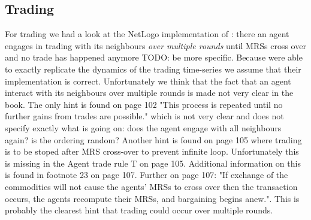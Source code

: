 \subsection{Trading}
For trading we had a look at the NetLogo implementation of \cite{weaver_replicating_nodate}: there an agent engages in trading with its neighbours \textit{over multiple rounds} until MRSs cross over and no trade has happened anymore TODO: be more specific. Because \cite{weaver_replicating_nodate} were able to exactly replicate the dynamics of the trading time-series we assume that their implementation is correct. Unfortunately we think that the fact that an agent interact with its neighbours over multiple rounds is made not very clear in the book. The only hint is found on page 102 "This process is repeated until no further gains from trades are possible." which is not very clear and does not specify exactly what is going on: does the agent engage with all neighbours again? is the ordering random? Another hint is found on page 105 where trading is to be stoped after MRS cross-over to prevent infinite loop. Unfortunately this is missing in the Agent trade rule T on page 105. Additional information on this is found in footnote 23 on page 107. Further on page 107: "If exchange of the commodities will not cause the agents' MRSs to cross over then the transaction occurs, the agents recompute their MRSs, and bargaining begins anew.". This is probably the clearest hint that trading could occur over multiple rounds.
